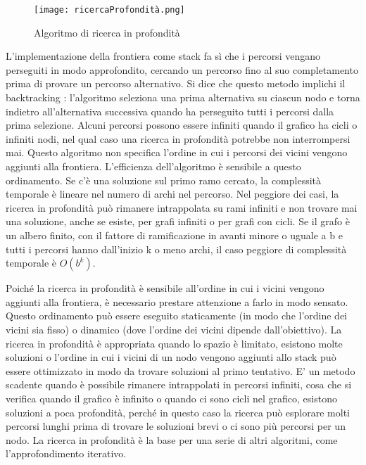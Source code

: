 \documentclass[a4paper]{extarticle}
\begin{document}
\begin{figure}[h!]
\begin{center}
\texttt{[image: ricercaProfondità.png]}
\caption{Algoritmo di ricerca in profondità}
\end{center}
\end{figure}

L'implementazione della frontiera come stack fa sì che i percorsi vengano perseguiti in modo approfondito, cercando un percorso fino al suo completamento prima di provare un percorso alternativo. Si dice che questo metodo implichi il backtracking : l'algoritmo seleziona una prima alternativa su ciascun nodo e torna indietro all'alternativa successiva quando ha perseguito tutti i percorsi dalla prima selezione. Alcuni percorsi possono essere infiniti quando il grafico ha cicli o infiniti nodi, nel qual caso una ricerca in profondità potrebbe non interrompersi mai. Questo algoritmo non specifica l'ordine in cui i percorsi dei vicini vengono aggiunti alla frontiera. L'efficienza dell'algoritmo è sensibile a questo ordinamento. Se c'è una soluzione sul primo ramo cercato, la complessità temporale è lineare nel numero di archi nel percorso. Nel peggiore dei casi, la ricerca in profondità può rimanere intrappolata su rami infiniti e non trovare mai una soluzione, anche se esiste, per grafi infiniti o per grafi con cicli. Se il grafo è un albero finito, con il fattore di ramificazione in avanti minore o uguale a b e tutti i percorsi hanno dall'inizio k o meno archi, il caso peggiore di complessità temporale è $O(b^k)$.

Poiché la ricerca in profondità è sensibile all'ordine in cui i vicini vengono aggiunti alla frontiera, è necessario prestare attenzione a farlo in modo sensato. Questo ordinamento può essere eseguito staticamente (in modo che l'ordine dei vicini sia fisso) o dinamico (dove l'ordine dei vicini dipende dall'obiettivo). La ricerca in profondità è appropriata quando lo spazio è limitato, esistono molte soluzioni o l'ordine in cui i vicini di un nodo vengono aggiunti allo stack può essere ottimizzato in modo da trovare soluzioni al primo tentativo. E' un metodo scadente quando è possibile rimanere intrappolati in percorsi infiniti, cosa che si verifica quando il grafico è infinito o quando ci sono cicli nel grafico, esistono soluzioni a poca profondità, perché in questo caso la ricerca può esplorare molti percorsi lunghi prima di trovare le soluzioni brevi o ci sono più percorsi per un nodo. La ricerca in profondità è la base per una serie di altri algoritmi, come l'approfondimento iterativo.
\end{document}

